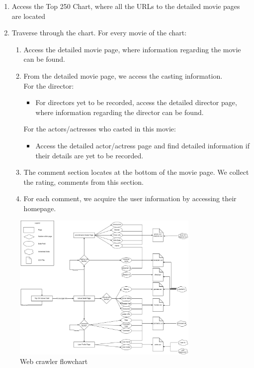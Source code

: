 \begin{CJK*}{UTF8}{gbsn}
\begin{enumerate}
    \item Access the Top 250 Chart, where all the URLs to the detailed movie pages are located
    \item Traverse through the chart. For every movie of the chart:
    \begin{enumerate}
        \item Access the detailed movie page, where information regarding the movie can be found.
        \item From the detailed movie page, we access the casting information.\\ For the director:
        \begin{itemize}
            \item For directors yet to be recorded, access the detailed director page, where information regarding the director can be found.
        \end{itemize}
        For the actors/actresses who casted in this movie:
        \begin{itemize}
            \item Access the detailed actor/actress page and find detailed information if their details are yet to be recorded.
        \end{itemize}
        \item The comment section locates at the bottom of the movie page. We collect the rating, comments from this section.
        \item For each comment, we acquire the user information by accessing their homepage.
    \end{enumerate}
\end{enumerate}

\begin{figure}[h]
    \label{crawler}
    \centering
    \includegraphics[width=0.8\textwidth]{crawler_flowchart.png}
    \caption{Web crawler flowchart}
\end{figure}


\end{CJK*}
